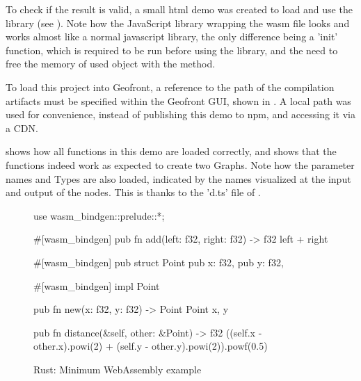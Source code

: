 To check if the result is valid, a small html demo was created to load and use the library (see ).
Note how the JavaScript library wrapping the wasm file looks and works almost like a normal javascript library, the only difference being a 'init' function, which is required to be run before using the library, and the need to free the memory of used object with the  method.

To load this project into Geofront, a reference to the path of the compilation artifacts must be specified within the Geofront GUI, shown in .
A local path was used for convenience, instead of publishing this demo to npm, and accessing it via a \ac{CDN}.

 shows how all functions in this demo are loaded correctly, and  shows that the functions indeed work as expected to create two Graphs. 
Note how the parameter names and Types are also loaded, indicated by the names visualized at the input and output of the nodes.
This is thanks to the 'd.ts' file of .

\begin{figure}
\begin{code}
use wasm_bindgen::prelude::*;

#[wasm_bindgen]
pub fn add(left: f32, right: f32) -> f32 {
    left + right
}

#[wasm_bindgen]
pub struct Point {
    pub x: f32,
    pub y: f32,
}

#[wasm_bindgen]
impl Point {

    pub fn new(x: f32, y: f32) -> Point {
        Point { x, y }
    }

    pub fn distance(&self, other: &Point) -> f32 {
        ((self.x - other.x).powi(2) + (self.y - other.y).powi(2)).powf(0.5) 
    }
}
\end{code}
\centering
\caption{Rust: Minimum WebAssembly example}
\label{fig:minimum-rust-wasm}
\end{figure}

